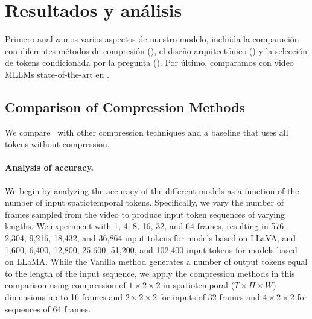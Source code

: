 \section{Resultados y análisis}

Primero analizamos varios aspectos de nuestro modelo, incluida la comparación con diferentes métodos de compresión (), el diseño arquitectónico () y la selección de tokens condicionada por la pregunta (). Por último, comparamos con video MLLMs state-of-the-art en .

\subsection{Comparison of Compression Methods}
\label{sec:compression}

We compare \model~with other compression techniques and a baseline that uses all tokens without compression. 

\paragraph{Analysis of accuracy.} We begin by analyzing the accuracy of the different models as a function of the number of input spatiotemporal tokens. Specifically, we vary the number of frames sampled from the video to produce input token sequences of varying lengths. We experiment with 1, 4, 8, 16, 32, and 64 frames, resulting in 576, 2,304, 9,216, 18,432, and 36,864 input tokens for models based on LLaVA, and 1,600, 6,400, 12,800, 25,600, 51,200, and 102,400 input tokens for models based on LLaMA. While the Vanilla method generates a number of output tokens equal to the length of the input sequence, we apply the compression methods in this comparison using compression of $1\times 2\times 2$ in spatiotemporal ($T\times H\times W$) dimensions up to 16 frames and $2\times 2\times 2$ for inputs of 32 frames and $4\times 2\times 2$ for sequences of 64 frames.

